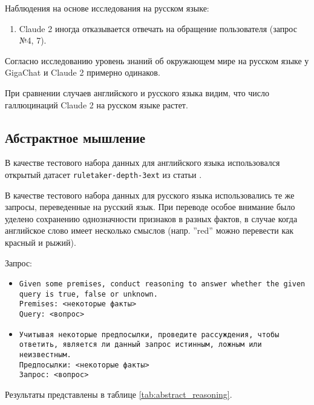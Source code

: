 \documentclass{article}
\begin{document}
Наблюдения на основе исследования на русском языке:
\begin{enumerate}
    \item Claude 2 иногда отказывается отвечать на обращение пользователя (запрос №4, 7).
\end{enumerate}

Согласно исследованию уровень знаний об окружающем мире на русском языке у GigaChat и Claude 2 примерно одинаков.

При сравнении случаев английского и русского языка видим, что число галлюцинаций Claude 2 на русском языке растет.

\subsection*{Абстрактное мышление}
В качестве тестового набора данных для английского языка использовался открытый датасет \texttt{ruletaker-depth-3ext} из статьи \cite{ruletaker}.

В качестве тестового набора данных для русского языка использовались те же запросы, переведенные на русский язык. При переводе особое внимание было уделено сохранению однозначности признаков в разных фактов, в случае когда английское слово имеет несколько смыслов (напр. ''red''  можно перевести как красный и рыжий).

Запрос:
\begin{itemize}
    \item \texttt{Given some premises, conduct reasoning to answer whether the given query is true, false or unknown. \\ Premises: <некоторые факты> \\
              Query: <вопрос>}
    \item \texttt{Учитывая некоторые предпосылки, проведите рассуждения, чтобы ответить, является ли данный запрос истинным, ложным или неизвестным. \\ Предпосылки: <некоторые факты> \\
              Запрос: <вопрос>}
\end{itemize}

Результаты представлены в таблице \ref{tab:abstract_reasoning}.
\end{document}
